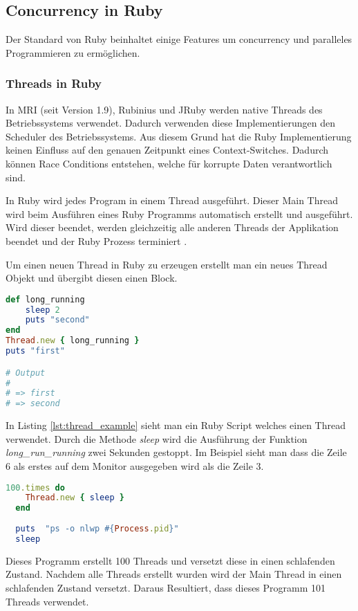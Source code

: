 \subsection{Concurrency in Ruby}
Der Standard von Ruby beinhaltet einige Features um concurrency und paralleles Programmieren zu ermöglichen.

\subsubsection{Threads in Ruby}
In MRI (seit Version 1.9), Rubinius und JRuby werden native Threads des Betriebssystems verwendet. Dadurch verwenden diese Implementierungen den Scheduler des Betriebssystems. Aus diesem Grund hat die Ruby Implementierung keinen Einfluss auf den genauen Zeitpunkt eines Context-Switches. Dadurch können Race Conditions entstehen, welche für korrupte Daten verantwortlich sind.

In Ruby wird jedes Program in einem Thread ausgeführt. Dieser Main Thread wird beim Ausführen eines Ruby Programms automatisch erstellt und ausgeführt. Wird dieser beendet, werden gleichzeitig alle anderen Threads der Applikation beendet und der Ruby Prozess terminiert \cite[p. 15]{Sto2013}.

Um einen neuen Thread in Ruby zu erzeugen erstellt man ein neues Thread Objekt und übergibt diesen einen Block. 

\begin{lstlisting}[language=Ruby,label=lst:thread_example]
def long_running
	sleep 2
	puts "second"
end
Thread.new { long_running }
puts "first"

# Output
#
# => first
# => second

\end{lstlisting}

In Listing \ref{lst:thread_example} sieht man ein Ruby Script welches einen Thread verwendet. Durch die Methode \emph{sleep} wird die Ausführung der Funktion \textit{long\_run\_running} zwei Sekunden gestoppt. Im Beispiel sieht man dass die Zeile 6 als erstes auf dem Monitor ausgegeben wird als die Zeile 3. 

\begin{lstlisting}[language=Ruby,caption=Adaptiert von \cite{Sto2013}]
  100.times do
    Thread.new { sleep }
  end
  
  puts  "ps -o nlwp #{Process.pid}"
  sleep
\end{lstlisting} 

Dieses Programm erstellt 100 Threads und versetzt diese in einen schlafenden Zustand. Nachdem alle Threads erstellt wurden wird der Main Thread in einen schlafenden Zustand versetzt. Daraus Resultiert, dass dieses Programm 101 Threads verwendet. 

